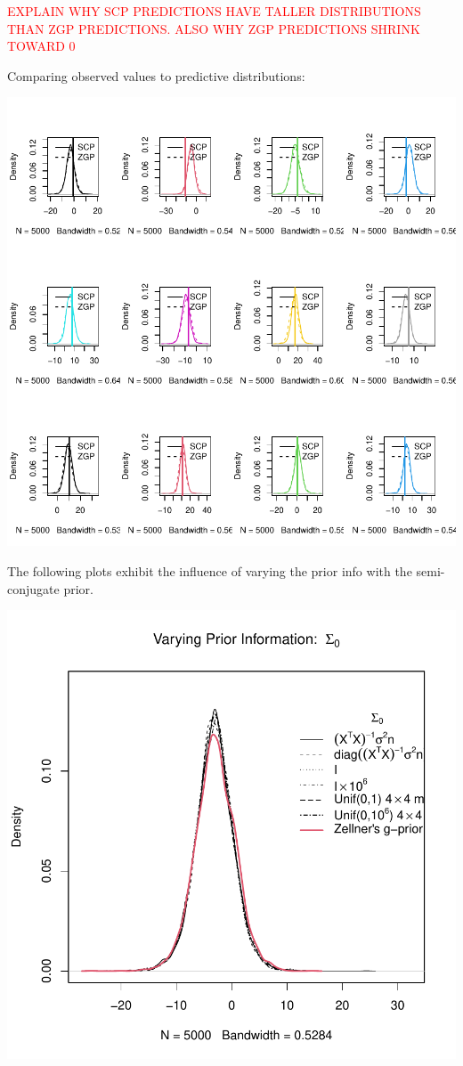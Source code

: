 \documentclass[12pt, a4paper]{article}
\begin{document}
\textcolor{red}{EXPLAIN WHY SCP PREDICTIONS HAVE TALLER DISTRIBUTIONS THAN ZGP PREDICTIONS.  ALSO WHY ZGP PREDICTIONS SHRINK TOWARD 0}

\clearpage

Comparing observed values to predictive distributions:

\includegraphics{Thesis-021}





The following plots exhibit the influence of varying the prior info with the semi-conjugate prior.

\includegraphics{Thesis-022}
\end{document}
